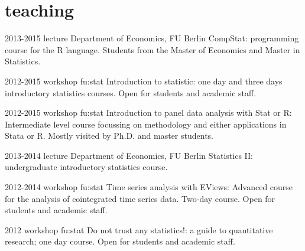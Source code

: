 \documentclass[]{friggeri-cv} %
\begin{document}


\section{teaching}

\begin{entrylist}


\entry
{2013-2015}
{lecture}
{Department of Economics, FU Berlin}
{CompStat: programming course for the R language. Students from the Master of Economics and Master in Statistics.}


\entry
{2012-2015}
{workshop}
{fu:stat}
{Introduction to statistic: one day and three days introductory statistics courses. Open for students and academic staff.}


\entry
{2012-2015}
{workshop}
{fu:stat}
{Introduction to panel data analysis with Stat or R: Intermediate level course focussing on methodology and either applications in Stata or R. Mostly visited by Ph.D. and master students.}


\entry
{2013-2014}
{lecture}
{Department of Economics, FU Berlin}
{Statistics II: undergraduate introductory statistics course.}


\entry
{2012-2014}
{workshop}
{fu:stat}
{Time series analysis with EViews: Advanced course for the analysis of cointegrated time series data. Two-day course. Open for students and academic staff.}


\entry
{2012}
{workshop}
{fu:stat}
{Do not trust any statistics!: a guide to quantitative research; one day course. Open for students and academic staff.}

%
\end{entrylist}
\end{document}
